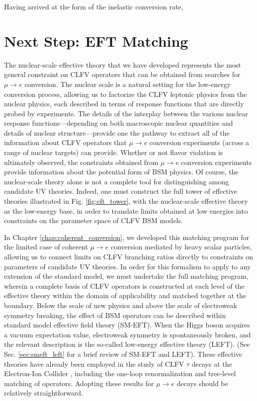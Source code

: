 \documentclass{book}[letterpaper,12pt]
\begin{document}
Having arrived at the form of the inelastic conversion rate, 
\section{Next Step: EFT Matching}
The nuclear-scale effective theory that we have developed represents the most general constraint on CLFV operators that can be obtained from searches for $\mu\rightarrow e$ conversion. The nuclear scale is a natural setting for the low-energy conversion process, allowing us to factorize the CLFV leptonic physics from the nuclear physics, each described in terms of response functions that are directly probed by experiments. The details of the interplay between the various nuclear response functions---depending on both macroscopic nuclear quantities and details of nuclear structure---provide one the pathway to extract all of the information about CLFV operators that $\mu\rightarrow e$ conversion experiments (across a range of nuclear targets) can provide. Whether or not flavor violation is ultimately observed, the constraints obtained from $\mu\rightarrow e$ conversion experiments provide information about the potential form of BSM physics. Of course, the nuclear-scale theory alone is not a complete tool for distinguishing among candidate UV theories. Indeed, one must construct the full tower of effective theories illustrated in Fig. \ref{fig:eft_tower}, with the nuclear-scale effective theory as the low-energy base, in order to translate limits obtained at low energies into constraints on the parameter space of CLFV BSM models.

In Chapter \ref{chap:coherent_conversion}, we developed this matching program for the limited case of coherent $\mu\rightarrow e$ conversion mediated by heavy scalar particles, allowing us to connect limits on CLFV branching ratios directly to constraints on parameters of candidate UV theories. In order for this formalism to apply to any extension of the standard model, we must undertake the full matching program, wherein a complete basis of CLFV operators is constructed at each level of the effective theory within the domain of applicability and matched together at the boundary. Below the scale of new physics and above the scale of electroweak symmetry breaking, the effect of BSM operators can be described within standard model effective field theory (SM-EFT). When the Higgs boson acquires a vacuum expectation value, electroweak symmetry is spontaneously broken, and the relevant description is the so-called low-energy effective theory (LEFT). (See Sec. \ref{sec:smeft_left} for a brief review of SM-EFT and LEFT). These effective theories have already been employed in the study of CLFV $\tau$ decays at the Electron-Ion Collider \cite{Cirigliano:2021img}, including the one-loop renormalization and tree-level matching of operators. Adopting these results for $\mu\rightarrow e$ decays should be relatively straightforward.
\end{document}
